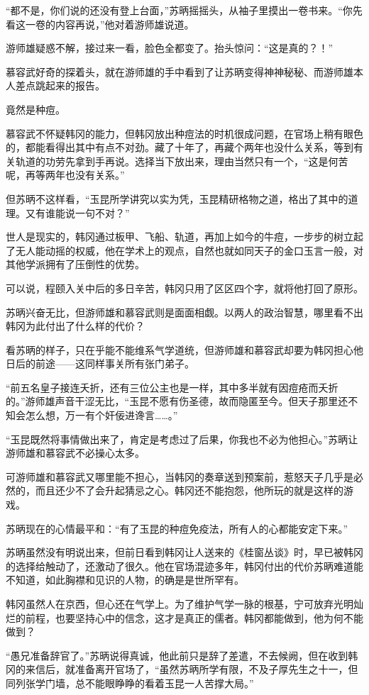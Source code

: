 “都不是，你们说的还没有登上台面，”苏昞摇摇头，从袖子里摸出一卷书来。“你先看这一卷的内容再说，”他对着游师雄说道。

游师雄疑惑不解，接过来一看，脸色全都变了。抬头惊问：“这是真的？！”

慕容武好奇的探着头，就在游师雄的手中看到了让苏昞变得神神秘秘、而游师雄本人差点跳起来的报告。

竟然是种痘。

慕容武不怀疑韩冈的能力，但韩冈放出种痘法的时机很成问题，在官场上稍有眼色的，都能看得出其中有点不对劲。藏了十年了，再藏个两年也没什么关系，等到有关轨道的功劳先拿到手再说。选择当下放出来，理由当然只有一个，“这是何苦呢，再等两年也没有关系。”

但苏昞不这样看，“玉昆所学讲究以实为凭，玉昆精研格物之道，格出了其中的道理。又有谁能说一句不对？”

世人是现实的，韩冈通过板甲、飞船、轨道，再加上如今的牛痘，一步步的树立起了无人能动摇的权威，他在学术上的观点，自然也就如同天子的金口玉言一般，对其他学派拥有了压倒性的优势。

可以说，程颐入关中后的多日辛苦，韩冈只用了区区四个字，就将他打回了原形。

苏昞兴奋无比，但游师雄和慕容武则是面面相觑。以两人的政治智慧，哪里看不出韩冈为此付出了什么样的代价？

看苏昞的样子，只在乎能不能维系气学道统，但游师雄和慕容武却要为韩冈担心他日后的前途——这同样事关所有张门弟子。

“前五名皇子接连夭折，还有三位公主也是一样，其中多半就有因痘疮而夭折的。”游师雄声音干涩无比，“玉昆不愿有伤圣德，故而隐匿至今。但天子那里还不知会怎么想，万一有个奸佞进谗言……。”

“玉昆既然将事情做出来了，肯定是考虑过了后果，你我也不必为他担心。”苏昞让游师雄和慕容武不必操心太多。

可游师雄和慕容武又哪里能不担心，当韩冈的奏章送到预案前，惹怒天子几乎是必然的，而且还少不了会升起猜忌之心。韩冈还不能抱怨，他所玩的就是这样的游戏。

苏昞现在的心情最平和：“有了玉昆的种痘免疫法，所有人的心都能安定下来。”

苏昞虽然没有明说出来，但前日看到韩冈让人送来的《桂窗丛谈》时，早已被韩冈的选择给触动了，还激动了很久。他在官场混迹多年，韩冈付出的代价苏昞难道能不知道，如此胸襟和见识的人物，的确是是世所罕有。

韩冈虽然人在京西，但心还在气学上。为了维护气学一脉的根基，宁可放弃光明灿烂的前程，也要坚持心中的信念，这才是真正的儒者。韩冈都能做到，他为何不能做到？

“愚兄准备辞官了。”苏昞说得真诚，他此前只是辞了差遣，不去候阙，但在收到韩冈的来信后，就准备离开官场了，“虽然苏昞所学有限，不及子厚先生之十一，但同列张学门墙，总不能眼睁睁的看着玉昆一人苦撑大局。”


